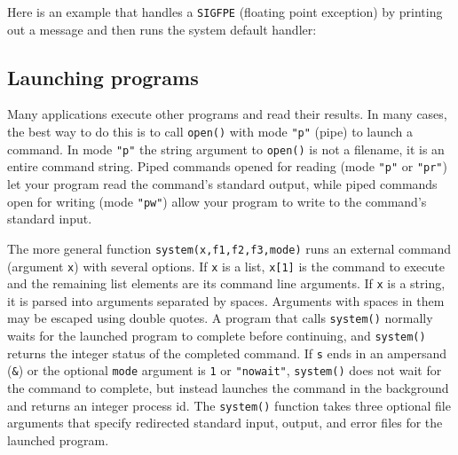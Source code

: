 Here is an example that handles a \texttt{SIGFPE} (floating point exception) by
printing out a message and then runs the system default handler:


\subsection*{Launching programs}

Many applications execute other programs and read their results. In many cases,
the best way to do this is to call \texttt{open()} with mode \texttt{"p"}
(pipe) to launch a command. In mode \texttt{"p"} the string argument
to \texttt{open()} is not a filename, it is an entire command string. Piped
commands opened for reading (mode \texttt{"p"} or \texttt{"pr"}) let your
program read the command's standard output, while piped commands open for
writing (mode \texttt{"pw"}) allow your program to write to the command's
standard input.

The more general function \texttt{system(x,f1,f2,f3,mode)} runs an external
command (argument \texttt{x}) with several options. If \texttt{x} is a list,
\texttt{x[1]} is the command to execute and the remaining list elements are its
command line arguments. If \texttt{x} is a string, it is parsed into arguments
separated by spaces. Arguments with spaces in them may be escaped using double
quotes. A program that calls \texttt{system()} normally waits
for the launched program to complete before continuing, and \texttt{system()}
returns the integer status of the completed command. If \texttt{s} ends in an
ampersand (\texttt{\&}) or the optional \texttt{mode} argument is \texttt{1} or
\texttt{"nowait"}, \texttt{system()} does not wait for the command to complete,
but instead launches the command in the background and returns an integer
process id. The \texttt{system()} function takes three optional file arguments
that specify redirected standard input, output, and error files for the launched
program.

